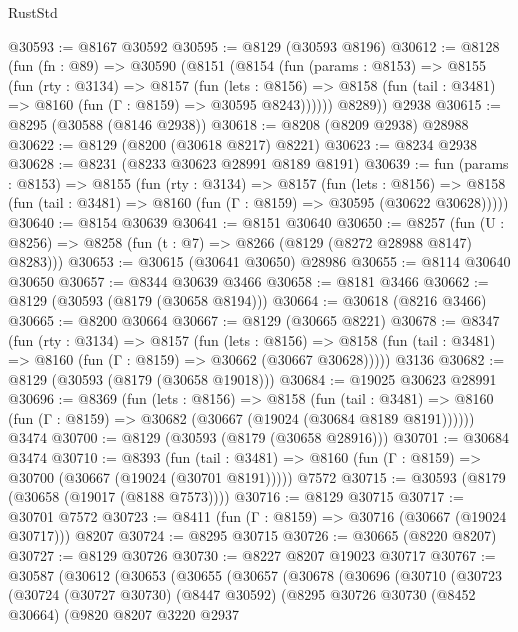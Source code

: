 \begin{lexlean}{RustStd}
\begin{coremodule}
@30593 := @8167 @30592
@30595 := @8129 (@30593 @8196)
@30612 := @8128
    (fun (fn : @89) =>
    @30590
      (@8151
        (@8154
          (fun (params : @8153) =>
          @8155
            (fun (rty : @3134) =>
            @8157
              (fun (lets : @8156) =>
              @8158 (fun (tail : @3481) => @8160 (fun (Γ : @8159) => @30595 @8243))))))
        @8289))
    @2938
@30615 := @8295 (@30588 (@8146 @2938))
@30618 := @8208 (@8209 @2938) @28988
@30622 := @8129 (@8200 (@30618 @8217) @8221)
@30623 := @8234 @2938
@30628 := @8231 (@8233 @30623 @28991 @8189 @8191)
@30639 := fun (params : @8153) =>
  @8155
    (fun (rty : @3134) =>
    @8157
      (fun (lets : @8156) =>
      @8158 (fun (tail : @3481) => @8160 (fun (Γ : @8159) => @30595 (@30622 @30628)))))
@30640 := @8154 @30639
@30641 := @8151 @30640
@30650 := @8257
    (fun (U : @8256) => @8258 (fun (t : @7) => @8266 (@8129 (@8272 @28988 @8147) @8283)))
@30653 := @30615 (@30641 @30650) @28986
@30655 := @8114 @30640 @30650
@30657 := @8344 @30639 @3466
@30658 := @8181 @3466
@30662 := @8129 (@30593 (@8179 (@30658 @8194)))
@30664 := @30618 (@8216 @3466)
@30665 := @8200 @30664
@30667 := @8129 (@30665 @8221)
@30678 := @8347
    (fun (rty : @3134) =>
    @8157
      (fun (lets : @8156) =>
      @8158 (fun (tail : @3481) => @8160 (fun (Γ : @8159) => @30662 (@30667 @30628)))))
    @3136
@30682 := @8129 (@30593 (@8179 (@30658 @19018)))
@30684 := @19025 @30623 @28991
@30696 := @8369
    (fun (lets : @8156) =>
    @8158
      (fun (tail : @3481) =>
      @8160 (fun (Γ : @8159) => @30682 (@30667 (@19024 (@30684 @8189 @8191))))))
    @3474
@30700 := @8129 (@30593 (@8179 (@30658 @28916)))
@30701 := @30684 @3474
@30710 := @8393
    (fun (tail : @3481) => @8160 (fun (Γ : @8159) => @30700 (@30667 (@19024 (@30701 @8191)))))
    @7572
@30715 := @30593 (@8179 (@30658 (@19017 (@8188 @7573))))
@30716 := @8129 @30715
@30717 := @30701 @7572
@30723 := @8411 (fun (Γ : @8159) => @30716 (@30667 (@19024 @30717))) @8207
@30724 := @8295 @30715
@30726 := @30665 (@8220 @8207)
@30727 := @8129 @30726
@30730 := @8227 @8207 @19023 @30717
@30767 := @30587
    (@30612
      (@30653
        (@30655
          (@30657
            (@30678
              (@30696
                (@30710
                  (@30723
                    (@30724
                      (@30727 @30730)
                      (@8447 @30592)
                      (@8295
                        @30726
                        @30730
                        (@8452 @30664)
                        (@9820
                          @8207
                          @3220
                          @2937

\end{coremodule}
\end{lexlean}
